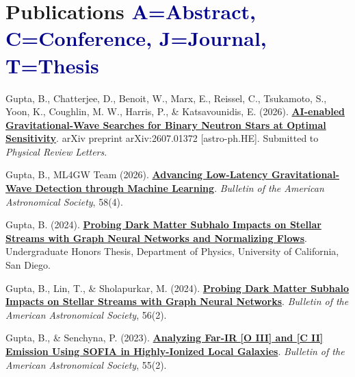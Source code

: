 \documentclass[a4paper,11pt]{article}
\begin{document}
\section{\textbf{Publications} \hfill \textcolor{darkblue}{\scriptsize A=Abstract, C=Conference, J=Journal, T=Thesis}}
\vspace{0.2mm}
\small{
\begin{enumerate}[
    leftmargin=*,
    labelsep=0.5em,
    align=left,
    widest={[\textbf{A.1}]},
    itemindent=0em,
    label={}
]

\item[\textbf{[J.1]}] Gupta, B., Chatterjee, D., Benoit, W., Marx, E., Reissel, C., Tsukamoto, S., Yoon, K., Coughlin, M. W., Harris, P., \& Katsavounidis, E. (2026). \href{https://arxiv.org/abs/2607.01372}{\textbf{AI-enabled Gravitational-Wave Searches for Binary Neutron Stars at Optimal Sensitivity}}. arXiv preprint arXiv:2607.01372 [astro-ph.HE]. Submitted to \textit{Physical Review Letters}.

\item[\textbf{[A.1]}] Gupta, B., ML4GW Team (2026). \href{https://ui.adsabs.harvard.edu/abs/2026AAS...24821608G/abstract}{\textbf{Advancing Low-Latency Gravitational-Wave Detection through Machine Learning}}. \textit{Bulletin of the American Astronomical Society}, 58(4).

\item[\textbf{[T.1]}] Gupta, B. (2024). \href{https://drive.google.com/file/d/1rnXnXqiScRZL1ZBdSCI-yFbN3iEXHNlf/view}{\textbf{Probing Dark Matter Subhalo Impacts on Stellar Streams with Graph Neural Networks and Normalizing Flows}}. Undergraduate Honors Thesis, Department of Physics, University of California, San Diego.

\item[\textbf{[A.2]}] Gupta, B., Lin, T., \& Sholapurkar, M. (2024). \href{https://doi.org/10.3847/25c2cfeb.5960a460}{\textbf{Probing Dark Matter Subhalo Impacts on Stellar Streams with Graph Neural Networks}}. \textit{Bulletin of the American Astronomical Society}, 56(2).

\item[\textbf{[A.3]}] Gupta, B., \& Senchyna, P. (2023). \href{https://baas.aas.org/pub/2023n2i361p02}{\textbf{Analyzing Far-IR [O III] and [C II] Emission Using SOFIA in Highly-Ionized Local Galaxies}}. \textit{Bulletin of the American Astronomical Society}, 55(2).

\end{enumerate}
}

\vspace{-3mm}
\end{document}
